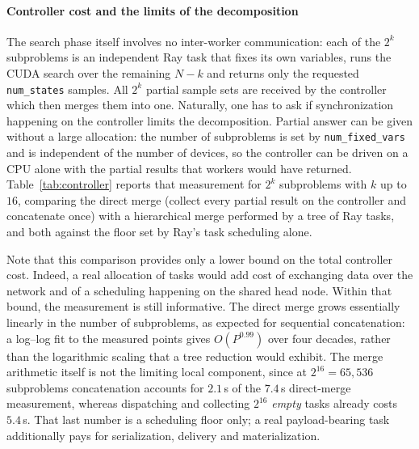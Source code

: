\documentclass[12pt,a4paper]{elsarticle}
\begin{document}
\paragraph{Controller cost and the limits of the decomposition}
The search phase itself involves no inter-worker communication: each of the
$2^{k}$ subproblems is an independent Ray task that fixes its own variables, runs
the CUDA search over the remaining $N-k$ and returns only the requested
\texttt{num\_states} samples. All $2^{k}$ partial sample sets are received by the controller
which then merges them into one. Naturally, one has to ask if synchronization happening
on the controller limits the decomposition. Partial answer can be
given without a large allocation: the number of subproblems is set by
\texttt{num\_fixed\_vars} and is independent of the number of devices, so the controller can be
driven on a CPU alone with the partial results that workers would have returned.
Table~\ref{tab:controller} reports that measurement for $2^{k}$ subproblems with $k$ up to
$16$, comparing the direct merge (collect every partial result on the controller and
concatenate once) with a hierarchical merge performed by a tree of Ray tasks, and both
against the floor set by Ray's task scheduling alone.

Note that this comparison provides only a lower bound on the total controller cost.
Indeed, a real allocation of tasks would add cost of exchanging data over the network and
of a scheduling happening on the shared head node. Within that bound, the measurement is
still informative. The direct merge grows essentially linearly in the number of subproblems,
as expected for sequential concatenation: a log--log fit to the measured points gives
$O(P^{0.99})$ over four decades, rather than the logarithmic scaling that a tree reduction
would exhibit. The merge arithmetic itself is not the limiting local component, since at
$2^{16}=65{,}536$ subproblems concatenation accounts for $2.1$\,s of the $7.4$\,s direct-merge
measurement, whereas dispatching and collecting $2^{16}$ \emph{empty} tasks already costs
$5.4$\,s. That last number is a scheduling floor only; a real payload-bearing task
additionally pays for serialization, delivery and materialization.
\end{document}
